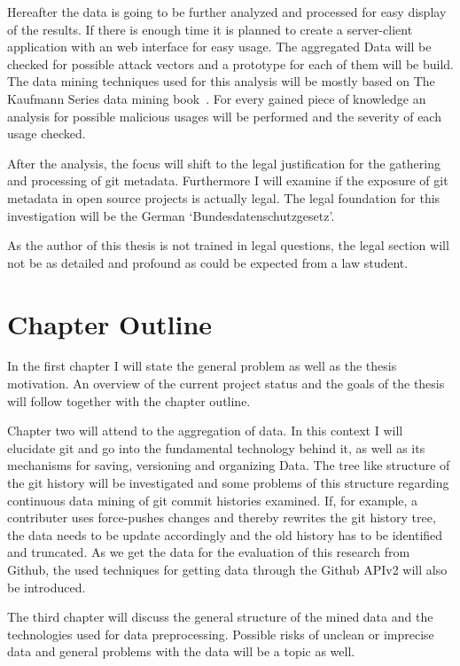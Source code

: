 \documentclass[
  twoside,
  11pt, a4paper,
  footinclude=true,
  headinclude=true,
  cleardoublepage=empty
]{scrreprt}
\begin{document}
Hereafter the data is going to be further analyzed and processed for easy display of the results.
If there is enough time it is planned to create a server-client application with an web interface for easy usage.
The aggregated Data will be checked for possible attack vectors and a prototype for each of them will be build.
The data mining techniques used for this analysis will be mostly based on The Kaufmann Series data mining book~\cite{book:data-mining}.
For every gained piece of knowledge an analysis for possible malicious usages will be performed and the severity of each usage checked.

After the analysis, the focus will shift to the legal justification for the gathering and processing of git metadata.
Furthermore I will examine if the exposure of git metadata in open source projects is actually legal.
The legal foundation for this investigation will be the German `Bundesdatenschutzgesetz'.

As the author of this thesis is not trained in legal questions, the legal section will not be as detailed and profound as could be expected from a law student.

\chapter{Chapter Outline}

In the first chapter I will state the general problem as well as the thesis motivation.
An overview of the current project status and the goals of the thesis will follow together with the chapter outline.

Chapter two will attend to the aggregation of data. In this context I will elucidate git and go into the fundamental technology behind it, as well as its mechanisms for saving, versioning and organizing Data.
The tree like structure of the git history will be investigated and some problems of this structure regarding continuous data mining of git commit histories examined.
If, for example, a contributer uses force-pushes changes and thereby rewrites the git history tree, the data needs to be update accordingly and the old history has to be identified and truncated.
As we get the data for the evaluation of this research from Github, the used techniques for getting data through the Github APIv2 will also be introduced.

The third chapter will discuss the general structure of the mined data and the technologies used for data preprocessing.
Possible risks of unclean or imprecise data and general problems with the data will be a topic as well.
\end{document}
